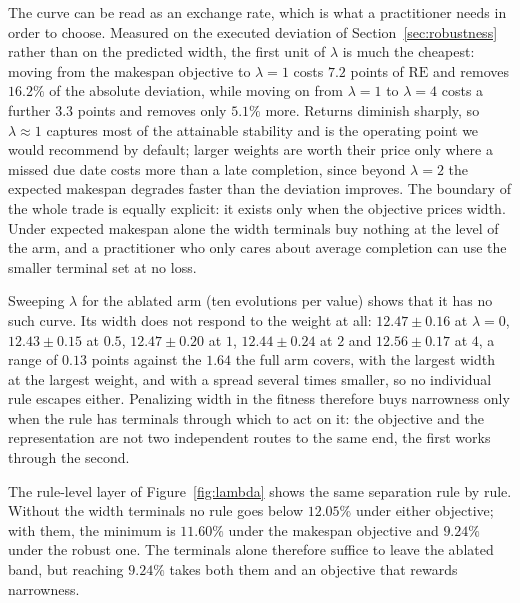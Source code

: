 \documentclass[review,authoryear,11pt]{elsarticle}
\newcommand{\rev}[1]{\textcolor{revcolor}{#1}}
\newcommand{\RE}{\mathrm{RE}}
\begin{document}
\rev{The curve can be read as an exchange rate, which is what a
practitioner needs in order to choose. Measured on the executed
deviation of Section~\ref{sec:robustness} rather than on the predicted
width, the first unit of $\lambda$ is much the cheapest: moving from the
makespan objective to $\lambda = 1$ costs $7.2$ points of $\RE$ and
removes $16.2\%$ of the absolute deviation, while moving on from
$\lambda = 1$ to $\lambda = 4$ costs a further $3.3$ points and removes
only $5.1\%$ more. Returns diminish sharply, so $\lambda \approx 1$
captures most of the attainable stability and is the operating point we
would recommend by default; larger weights are worth their price only
where a missed due date costs more than a late completion, since beyond
$\lambda = 2$ the expected makespan degrades faster than the deviation
improves. The boundary of the whole trade is equally explicit: it exists
only when the objective prices width. Under expected makespan alone the
width terminals buy nothing at the level of the arm, and a practitioner
who only cares about average completion can use the smaller terminal set
at no loss.}

Sweeping $\lambda$ for the ablated arm (ten evolutions per value)
shows that it has no such curve. Its width does not respond to the
weight at all: $12.47 \pm 0.16$ at $\lambda = 0$, $12.43 \pm 0.15$ at
$0.5$, $12.47 \pm 0.20$ at $1$, $12.44 \pm 0.24$ at $2$ and
$12.56 \pm 0.17$ at $4$, a range of $0.13$ points against the $1.64$
the full arm covers, with the largest width at the largest weight, and
with a spread several times smaller, so no individual rule escapes
either. Penalizing width in the fitness therefore buys narrowness only
when the rule has terminals through which to act on it: the objective
and the representation are not two independent routes to the same end,
the first works through the second.

The rule-level layer of Figure~\ref{fig:lambda} shows the same
separation rule by rule. Without the
width terminals no rule goes below $12.05\%$ under either objective;
with them, the minimum is $11.60\%$ under the makespan objective and
$9.24\%$ under the robust one. The terminals alone therefore suffice to
leave the ablated band, but reaching $9.24\%$ takes both them and an
objective that rewards narrowness.
\end{document}
